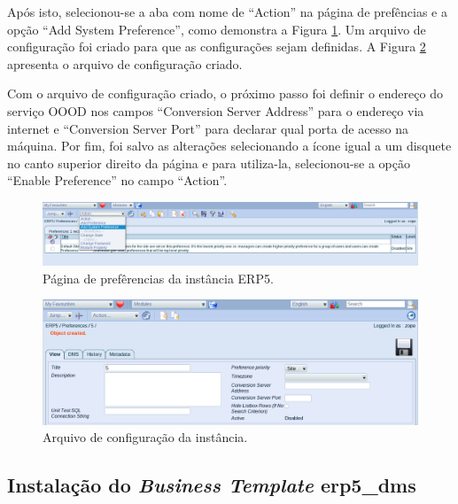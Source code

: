 Após isto, selecionou-se a aba com nome de ``Action'' na página de prefências e a opção ``Add System Preference'', como demonstra a Figura \ref{fig:action_pref}. Um arquivo de configuração foi criado para que as configurações sejam definidas. A Figura \ref{fig:add_system_pref} apresenta o arquivo de configuração criado.

Com o arquivo de configuração criado, o próximo passo foi definir o endereço do serviço OOOD nos campos ``Conversion Server Address'' para o endereço via internet e ``Conversion Server Port'' para declarar qual porta de acesso na máquina. Por fim, foi salvo as alterações selecionando a ícone igual a um disquete no canto superior direito da página e para utiliza-la, selecionou-se a opção ``Enable Preference'' no campo ``Action''. 

\begin{figure}[!ht]
\centering
\begin{center}
\includegraphics[scale=0.460,bb=0 0 1010 130]{action_pref.png}
\end{center}
\caption{Página de prefêrencias da instância ERP5.}
\label{fig:action_pref}
\end{figure}

\begin{figure}[!ht]
\centering
\begin{center}
\includegraphics[scale=0.460,bb=0 0 1010 300]{add_system_pref.png}
\end{center}
\caption{Arquivo de configuração da instância.}
\label{fig:add_system_pref}
\end{figure}

\subsection{Instalação do \textit{Business Template} erp5\_dms}

